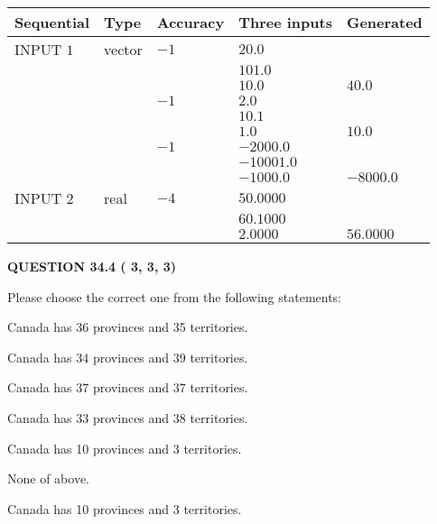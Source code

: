 \documentclass[12pt]{article}
\begin{document}
  
\noindent\begin{tabular}{|l|l|l|l|l|}
\hline
 Sequential & Type & Accuracy & Three inputs & Generated \\ 
\hline
 
 
  INPUT $           1$ & vector & $          -1 $ & $
20.0
  $ & \\
  & & & $
101.0
  $ & \\
  & & & $
10.0
$ & $ 40.0 $ 
  \\
  & & $          -1 $ & $
2.0
  $ & \\
  & & & $
10.1
  $ & \\
  & & & $
1.0
$ & $ 10.0 $ 
  \\
  & & $          -1 $ & $
-2000.0
  $ & \\
  & & & $
-10001.0
  $ & \\
  & & & $
-1000.0
$ & $ -8000.0 $ 
 \\  \hline  
 
 
  INPUT $           2$ & real & $          -4 $ & $
 50.0000
  $ & \\
  & & &  $
 60.1000
  $ & \\
  & & &  $
 2.0000
 $ & $ 56.0000 $ 
 \\  \hline  
 \end{tabular}
   
   
  
\vspace{0.2in}
  
{\textbf{\Large{QUESTION
34.4 
 (          3,          3,          3)
}}}
  
  
Please choose the correct one from the following statements:
 
 
Canada has  %
36 provinces and  %
35 territories.
 
 
Canada has  %
34 provinces and  %
39 territories.
 
 
Canada has  %
37 provinces and  %
37 territories.
 
 
Canada has  %
33 provinces and  %
38 territories.
 
 
Canada has  %
10 provinces and  %
3 territories.
 
 
 None of above.
 
 
\noindent{}
 
 
Canada has  %
10 provinces and  %
3 territories.
 
\end{document}
